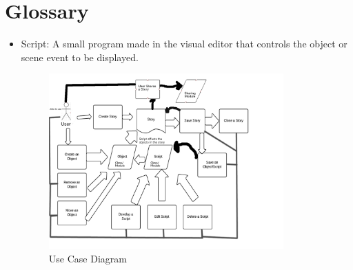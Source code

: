 \documentclass[12pt]{article}
\begin{document}
\section{Glossary}
\begin{itemize}
\item Script:  A small program made in the visual editor that controls the object or scene event to be displayed.


\begin{figure}[ht!]
\centering
\includegraphics[width=90mm]{FlowChart.png}
\caption{Use Case Diagram}
\label{overflow}
\end{figure}






\end{itemize}
\end{document}

